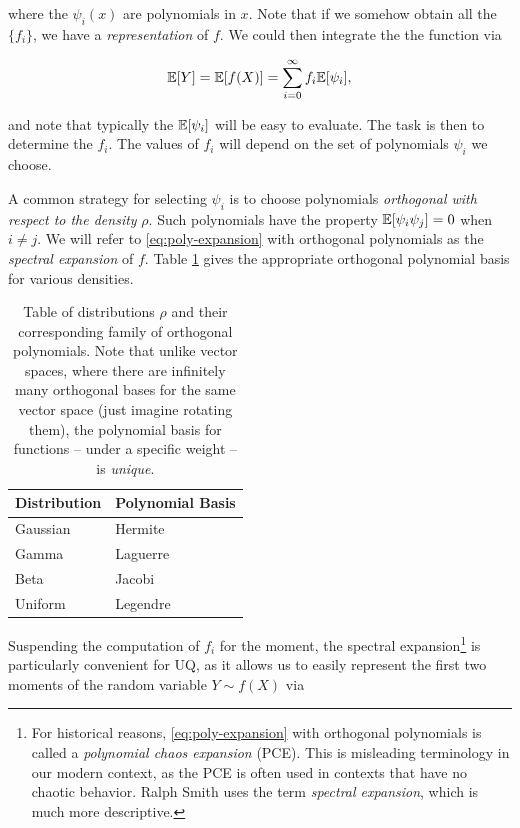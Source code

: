 \documentclass[../primer.tex]{subfiles}
\begin{document}
\noindent where the $\psi_i(x)$ are polynomials in
$x$.\cite{cameron1947orthogonal} Note that if we somehow obtain all the
$\{f_i\}$, we have a \emph{representation} of $f$. We could then integrate the
the function via

\begin{equation}
  \mathbb{E}[Y] = \mathbb{E}[f(X)] = \sum_{i=0}^{\infty} f_i \mathbb{E}[\psi_i],
\end{equation}

\noindent and note that typically the $\mathbb{E}[\psi_i]$ will be easy to evaluate. The
task is then to determine the $f_i$. The values of $f_i$ will depend on the set
of polynomials $\psi_i$ we choose.

A common strategy for selecting $\psi_i$ is to choose polynomials
\emph{orthogonal with respect to the density} $\rho$.\cite{xiu2002wiener} Such
polynomials have the property $\mathbb{E}[\psi_i\psi_j] = 0$ when $i\neq j$. We will
refer to \eqref{eq:poly-expansion} with orthogonal polynomials as the
\emph{spectral expansion} of $f$. Table \ref{tab:pce-basis} gives the
appropriate orthogonal polynomial basis for various densities.

\begin{table}[!ht]
  \centering
  \begin{tabular}{@{}ll@{}}
    Distribution & Polynomial Basis \\
    \hline
    Gaussian     & Hermite \\
    Gamma        & Laguerre \\
    Beta         & Jacobi \\
    Uniform      & Legendre
  \end{tabular}
  \caption{Table of distributions $\rho$ and their corresponding family of
    orthogonal polynomials. Note that unlike vector spaces, where there are
    infinitely many orthogonal bases for the same vector space (just imagine
    rotating them), the polynomial basis for functions -- under a specific
    weight -- is \emph{unique}.}
  \label{tab:pce-basis}
\end{table}

Suspending the computation of $f_i$ for the moment, the spectral
expansion\footnote{For historical reasons, \eqref{eq:poly-expansion} with
  orthogonal polynomials is called a \emph{polynomial chaos expansion} (PCE).
  This is misleading terminology in our modern context, as the PCE is often used
  in contexts that have no chaotic behavior. Ralph Smith uses the term
  \emph{spectral expansion}, which is much more descriptive.} is particularly
convenient for UQ, as it allows us to easily represent the first two moments of
the random variable $Y\sim f(X)$ via
\end{document}

